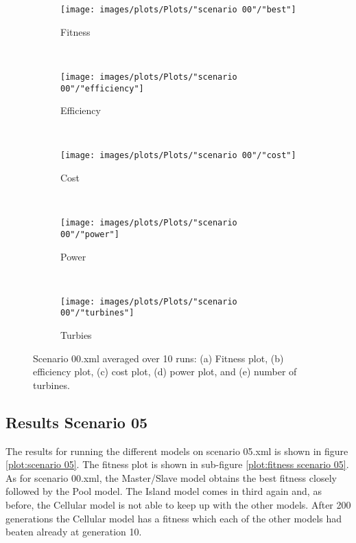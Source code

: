 \begin{figure}[h!]
    \centering
      \begin{subfigure}[b]{0.31\textwidth}
        \texttt{[image: images/plots/Plots/"scenario 00"/"best"]}
        \caption{Fitness}
        \hfill
        \label{plot:fitness plot scenario 00}
    \end{subfigure}
    ~
      \begin{subfigure}[b]{0.31\textwidth}
        \texttt{[image: images/plots/Plots/"scenario 00"/"efficiency"]}
        \caption{Efficiency}
        \hfill
        \label{plot:efficiency plot scenario 00}
    \end{subfigure}
    ~
    \begin{subfigure}[b]{0.31\textwidth}
        \texttt{[image: images/plots/Plots/"scenario 00"/"cost"]}
        \caption{Cost}
        \hfill
        \label{plot:cost plot scenario 00}
    \end{subfigure}
    ~
    \begin{subfigure}[b]{0.31\textwidth}
        \texttt{[image: images/plots/Plots/"scenario 00"/"power"]}
        \caption{Power}
        \hfill
        \label{plot:power plot scenario 00}
    \end{subfigure}
    ~
    \begin{subfigure}[b]{0.31\textwidth}
        \texttt{[image: images/plots/Plots/"scenario 00"/"turbines"]}
        \caption{Turbies}
        \hfill
        \label{plot:turbines plot scenario 00}
    \end{subfigure}
    \caption{Scenario 00.xml averaged over 10 runs: (a) Fitness plot, (b) efficiency plot, (c) cost plot, (d) power plot, and (e) number of turbines.}
    \label{plot:scenario 00}
\end{figure}


\subsection{Results Scenario 05}
The results for running the different models on scenario 05.xml is shown in figure \ref{plot:scenario 05}. The fitness plot is shown in sub-figure \ref{plot:fitness scenario 05}. As for scenario 00.xml, the Master/Slave model obtains the best fitness closely followed by the Pool model. The Island model comes in third again and, as before, the Cellular model is not able to keep up with the other models. After 200 generations the Cellular model has a fitness which each of the other models had beaten already at generation 10.\\


